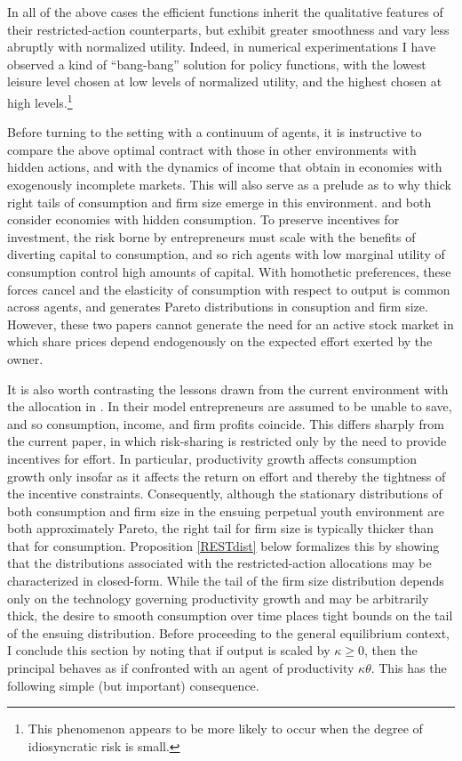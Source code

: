 \documentclass[11pt]{article}
\theoremstyle{plain}
\begin{document}
In all of the above cases the efficient functions inherit the qualitative features of their restricted-action counterparts, but exhibit greater smoothness and vary less abruptly with normalized utility. Indeed, in numerical experimentations I have observed a kind of ``bang-bang'' solution for policy functions, with the lowest leisure level chosen at low levels of normalized utility, and the highest chosen at high levels.\footnote{This phenomenon appears to be more likely to occur when the degree of idiosyncratic risk is small.}

Before turning to the setting with a continuum of agents, it is instructive to compare the above optimal contract with those in other environments with hidden actions, and with the dynamics of income that obtain in economies with exogenously incomplete markets. This will also serve as a prelude as to why thick right tails of consumption and firm size emerge in this environment. \cite{shourideh_optimal_2013} and \cite{phelan_optimality_2022} both consider economies with hidden consumption. To preserve incentives for investment, the risk borne by entrepreneurs must scale with the benefits of diverting capital to consumption, and so rich agents with low marginal utility of consumption control high amounts of capital. With homothetic preferences, these forces cancel and the elasticity of consumption with respect to output is common across agents, and generates Pareto distributions in consuption and firm size. However, these two papers cannot generate the need for an active stock market in which share prices depend endogenously on the expected effort exerted by the owner.


It is also worth contrasting the lessons drawn from the current environment with the allocation in \cite{jones_schumpeterian_2018}. In their model entrepreneurs are assumed to be unable to save, and so consumption, income, and firm profits coincide. This differs sharply from the current paper, in which risk-sharing is restricted only by the need to provide incentives for effort. In particular, productivity growth affects consumption growth only insofar as it affects the return on effort and thereby the tightness of the incentive constraints. Consequently, although the stationary distributions of both consumption and firm size in the ensuing perpetual youth environment are both approximately Pareto, the right tail for firm size is typically thicker than that for consumption. Proposition \ref{RESTdist} below formalizes this by showing that the distributions associated with the restricted-action allocations may be characterized in closed-form. While the tail of the firm size distribution depends only on the technology governing productivity growth and may be arbitrarily thick, the desire to smooth consumption over time places tight bounds on the tail of the ensuing distribution. Before proceeding to the general equilibrium context, I conclude this section by noting that if output is scaled by $\kappa \geq 0$, then the principal behaves as if confronted with an agent of productivity $\kappa \theta$. This has the following simple (but important) consequence.
\end{document}
